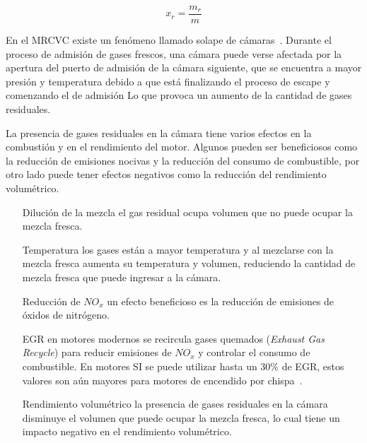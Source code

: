 \begin{equation}
    x_{r} = \frac{m_{r}}{m}
\end{equation}


En el MRCVC existe un fenómeno llamado solape de cámaras~\parencite{lopez13}.
%
Durante el proceso de admisión de gases frescos, una cámara puede verse afectada
por la apertura del puerto de admisión de la cámara siguiente, que se encuentra
a mayor presión y temperatura debido a que está finalizando el proceso de escape
y comenzando el de admisión
%
Lo que provoca un aumento de la cantidad de gases residuales.


La presencia de gases residuales en la cámara tiene varios efectos en la
combustión y en el rendimiento del motor.
%
Algunos pueden ser beneficiosos como la reducción de emisiones nocivas y la
reducción del consumo de combustible, por otro lado puede tener efectos
negativos como la reducción del rendimiento volumétrico.
%
\begin{itemize}
  \item[Dilución de la mezcla] el gas residual ocupa volumen que no puede ocupar
la mezcla fresca.
  \item[Temperatura] los gases están a mayor temperatura y al mezclarse con la
mezcla fresca aumenta su temperatura y volumen, reduciendo la cantidad de mezcla
fresca que puede ingresar a la cámara.
  \item[Reducción de $NO_{x}$] un efecto beneficioso es la reducción de
emisiones de óxidos de nitrógeno.
  \item[EGR] en motores modernos se recircula gases quemados (\textit{Exhaust
Gas Recycle}) para reducir emisiones de $NO_{x}$ y controlar el consumo de
combustible. En motores SI se puede utilizar hasta un 30\% de EGR, estos valores
son aún mayores para motores de encendido por chispa~\parencite{heywood}.
  \item[Rendimiento volumétrico] la presencia de gases residuales en la cámara
disminuye el volumen que puede ocupar la mezcla fresca, lo cual tiene un impacto
negativo en el rendimiento volumétrico.
\end{itemize}

